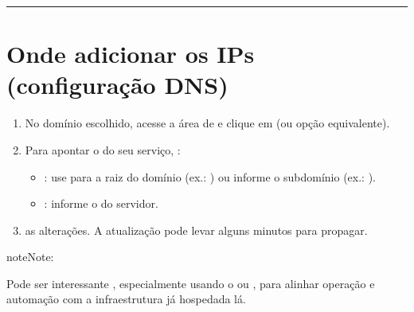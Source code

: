 \documentclass[letterpaper,10pt,brazil]{sphinxmanual}
\begin{document}
\bigskip\hrule\bigskip



\section{Onde adicionar os IPs (configuração DNS)}
\label{\detokenize{sistemas/registrobr:onde-adicionar-os-ips-configuracao-dns}}\begin{enumerate}
%
\item {} 
\sphinxAtStartPar
No domínio escolhido, acesse a área de  e clique em  (ou opção equivalente).

\item {} 
\sphinxAtStartPar
Para apontar o  do seu serviço, :
\begin{itemize}
\item {} 
\sphinxAtStartPar
{}: use  para a raiz do domínio (ex.: ) ou informe o subdomínio (ex.: ).

\item {} 
\sphinxAtStartPar
{}: informe o  do servidor.

\end{itemize}

\item {} 
\sphinxAtStartPar
{} as alterações. A atualização pode levar alguns minutos para propagar.

\end{enumerate}

\begin{sphinxadmonition}{note}{Note:}
\sphinxAtStartPar
{}

\sphinxAtStartPar
Pode ser interessante , especialmente usando o  ou , para alinhar operação e automação com a infraestrutura já hospedada lá.
\end{sphinxadmonition}



\renewcommand{\indexname}{Index}
\printindex
\end{document}
